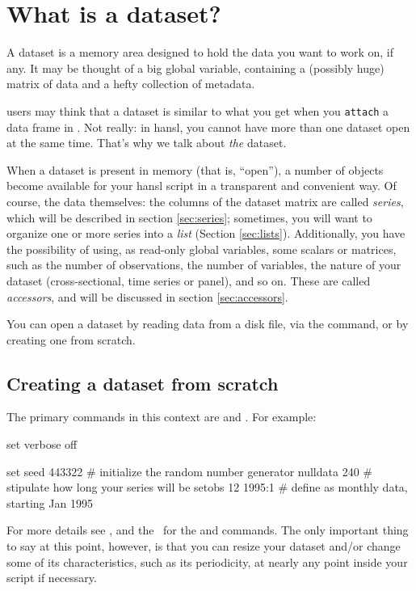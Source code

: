 \chapter{What is a dataset?}
\label{chap:dataset}

A dataset is a memory area designed to hold the data you want to work
on, if any. It may be thought of a big global variable, containing a
(possibly huge) matrix of data and a hefty collection of metadata.

 users may think that a dataset is similar to what you get when
you \texttt{attach} a data frame in . Not really: in hansl, you
cannot have more than one dataset open at the same time. That's why we
talk about \emph{the} dataset.

When a dataset is present in memory (that is, ``open''), a number of
objects become available for your hansl script in a transparent and
convenient way. Of course, the data themselves: the columns of the
dataset matrix are called \emph{series}, which will be described in
section \ref{sec:series}; sometimes, you will want to organize one or
more series into a \emph{list} (Section
\ref{sec:lists}). Additionally, you have the possibility of using, as
read-only global variables, some scalars or matrices, such as the
number of observations, the number of variables, the nature of your
dataset (cross-sectional, time series or panel), and so on. These are
called \emph{accessors}, and will be discussed in section
\ref{sec:accessors}.

You can open a dataset by reading data from a disk file, via the
 command, or by creating one from scratch.

\section{Creating a dataset from scratch}

The primary commands in this context are  and
.  For example:
\begin{code}
set verbose off

set seed 443322    # initialize the random number generator
nulldata 240       # stipulate how long your series will be
setobs 12 1995:1   # define as monthly data, starting Jan 1995
\end{code}

For more details see \GUG, and the \GCR\ for the  and
 commands. The only important thing to say at this point,
however, is that you can resize your dataset and/or change some of its
characteristics, such as its periodicity, at nearly any point inside
your script if necessary.

